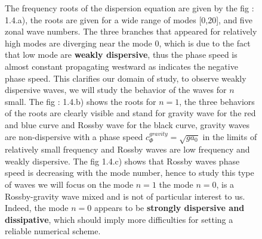 \documentclass[11pt,a4paper]{report}
\begin{document}
\begin{multicols}{2}
\begin{figure}[H]
        \caption{\footnotesize{The frequency roots of the dispersion equation are given by the fig : 1.4.a), the roots are given for a wide range of modes [0,20], and five zonal wave numbers. The three branches that appeared for relatively high modes are diverging near the mode 0, which is due to the fact that low mode are
                \textbf{weakly dispersive}, thus the phase speed is almost constant propagating westward as indicates the negative phase speed. This clarifies our domain of study, to observe weakly dispersive waves, we will study the behavior of the waves for $n$ small. The fig : 1.4.b) shows the roots for $n = 1$, the three behaviors of the roots are clearly visible and stand for gravity wave for the red and blue curve and Rossby wave for the black curve, gravity waves are non-dispersive with a phase speed $c_\Phi^{gravity} = \sqrt{ga_0}$ in the limits of relatively small frequency and Rossby waves are low frequency and  weakly dispersive. The fig 1.4.c)
                shows that Rossby waves phase speed is decreasing with the mode number, hence to study this type of waves we will focus on the mode $n=1$ the mode $n=0$, is a Rossby-gravity wave mixed and is not of particular interest to us.
                Indeed, the mode $n=0$ appears to be \textbf{strongly dispersive and dissipative}, which should imply more difficulties  for setting a reliable numerical scheme.}}
        \label{fig:}
    \end{figure}

\end{multicols}
\end{document}
